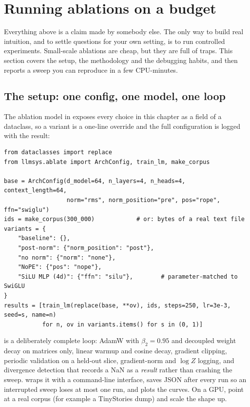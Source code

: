 \section{Running ablations on a budget}\label{sec:archdesign:ablate}

Everything above is a claim made by somebody else. The only way to build real intuition, and to settle
questions for your own setting, is to run controlled experiments. Small-scale ablations are cheap,
but they are full of traps. This section covers the setup, the methodology and the debugging
habits, and then reports a sweep you can reproduce in a few CPU-minutes.

\subsection{The setup: one config, one model, one loop}

The ablation model in  exposes every choice in this chapter as a field of a
dataclass, so a variant is a one-line override and the full configuration is logged with the result:

\begin{lstlisting}[caption={Configuring and running ablations.},label={lst:archdesign:config}]
from dataclasses import replace
from llmsys.ablate import ArchConfig, train_lm, make_corpus

base = ArchConfig(d_model=64, n_layers=4, n_heads=4, context_length=64,
                  norm="rms", norm_position="pre", pos="rope", ffn="swiglu")
ids = make_corpus(300_000)            # or: bytes of a real text file
variants = {
    "baseline": {},
    "post-norm": {"norm_position": "post"},
    "no norm": {"norm": "none"},
    "NoPE": {"pos": "nope"},
    "SiLU MLP (4d)": {"ffn": "silu"},        # parameter-matched to SwiGLU
}
results = [train_lm(replace(base, **ov), ids, steps=250, lr=3e-3, seed=s, name=n)
           for n, ov in variants.items() for s in (0, 1)]
\end{lstlisting}

 is a deliberately complete loop: AdamW with $\beta_2=0.95$ and decoupled weight decay on
matrices only, linear warmup and cosine decay, gradient clipping, periodic validation on a held-out
slice, gradient-norm and $\log Z$ logging, and divergence detection that records a NaN as a
\emph{result} rather than crashing the sweep.  wraps it with a
command-line interface, saves JSON after every run so an interrupted sweep loses at most one run, and
plots the curves. On a GPU, point  at a real corpus (for example a TinyStories dump) and
scale the shape up.

